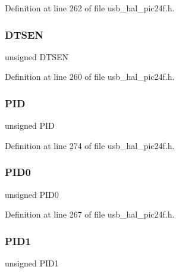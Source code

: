 Definition at line 262 of file usb\+\_\+hal\+\_\+pic24f.\+h.

\mbox{\label{union___b_d___s_t_a_t_adeff6f5de2d8ca0cfa956560288c3541}} 
\subsubsection{\texorpdfstring{DTSEN}{DTSEN}}
{\footnotesize\ttfamily unsigned D\+T\+S\+EN}



Definition at line 260 of file usb\+\_\+hal\+\_\+pic24f.\+h.

\mbox{\label{union___b_d___s_t_a_t_a97b41b25e06fd7857dcc6217c160a8ad}} 
\subsubsection{\texorpdfstring{PID}{PID}}
{\footnotesize\ttfamily unsigned P\+ID}



Definition at line 274 of file usb\+\_\+hal\+\_\+pic24f.\+h.

\mbox{\label{union___b_d___s_t_a_t_a810a2f6d15fc42c5d1e610b6e927d2eb}} 
\subsubsection{\texorpdfstring{PID0}{PID0}}
{\footnotesize\ttfamily unsigned P\+I\+D0}



Definition at line 267 of file usb\+\_\+hal\+\_\+pic24f.\+h.

\mbox{\label{union___b_d___s_t_a_t_acefd8c6eba334031c18cd877dfe08bfb}} 
\subsubsection{\texorpdfstring{PID1}{PID1}}
{\footnotesize\ttfamily unsigned P\+I\+D1}



